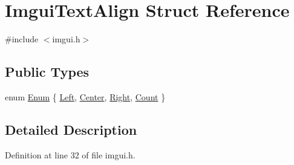 \hypertarget{struct_imgui_text_align}{\section{Imgui\+Text\+Align Struct Reference}
\label{struct_imgui_text_align}
}


{\ttfamily \#include $<$imgui.\+h$>$}

\subsection*{Public Types}
\begin{DoxyCompactItemize}
\item 
enum \hyperlink{struct_imgui_text_align_a8e5bef09f173b67144ba413e0ed392b1}{Enum} \{ \hyperlink{struct_imgui_text_align_a8e5bef09f173b67144ba413e0ed392b1a80ac9048af952ecdfbbf4993c4543487}{Left}, 
\hyperlink{struct_imgui_text_align_a8e5bef09f173b67144ba413e0ed392b1a5375bca22e89c7e357ffef074df57acd}{Center}, 
\hyperlink{struct_imgui_text_align_a8e5bef09f173b67144ba413e0ed392b1a30cb07d80f3084e1f3db08421b6fec26}{Right}, 
\hyperlink{struct_imgui_text_align_a8e5bef09f173b67144ba413e0ed392b1a95a41aae509483e37c0599052271e93c}{Count}
 \}
\end{DoxyCompactItemize}


\subsection{Detailed Description}


Definition at line 32 of file imgui.\+h.



